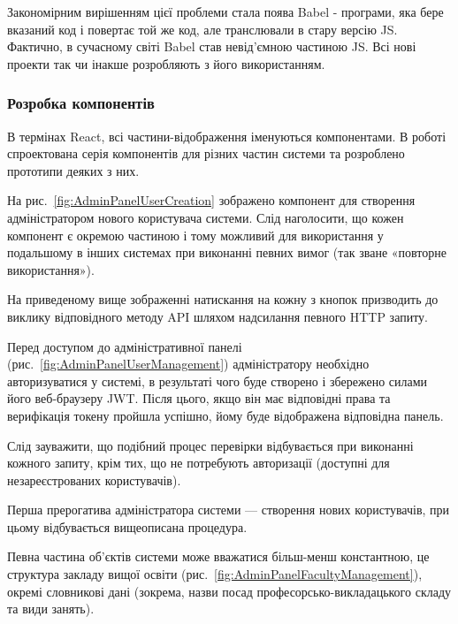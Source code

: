 Закономірним вирішенням цієї проблеми стала поява Babel - програми, яка бере вказаний код і повертає той же код, але транслювали в стару версію JS. Фактично, в сучасному світі Babel став невід'ємною частиною JS. Всі нові проекти так чи інакше розробляють з його використанням.

\subsubsection{Розробка компонентів}

В термінах React, всі частини-відображення іменуються компонентами. В роботі спроектована серія компонентів для різних частин системи та розроблено прототипи деяких з них. 

На рис.~\ref{fig:AdminPanelUserCreation} зображено компонент для створення адміністратором нового користувача системи. Слід наголосити, що кожен компонент є окремою частиною і тому можливий для використання у подальшому в інших системах при виконанні певних вимог (так зване «повторне використання»).


На приведеному вище зображенні натискання на кожну з кнопок призводить до виклику відповідного методу API шляхом надсилання певного HTTP запиту.

Перед доступом до адміністративної панелі (рис.~\ref{fig:AdminPanelUserManagement}) адміністратору необхідно авторизуватися у системі, в результаті чого буде створено і збережено силами його веб-браузеру JWT. Після цього, якщо він має відповідні права  та верифікація токену пройшла успішно, йому буде відображена відповідна панель.


Слід зауважити, що подібний процес перевірки відбувається при виконанні кожного запиту, крім тих, що не потребують авторизації (доступні для незареєстрованих користувачів).

Перша прерогатива адміністратора системи — створення нових користувачів, при цьому відбувається вищеописана процедура.

Певна частина об’єктів системи може вважатися більш-менш константною, це структура закладу вищої освіти (рис.~\ref{fig:AdminPanelFacultyManagement}), окремі словникові дані (зокрема, назви посад професорсько-викладацького складу та види занять).

